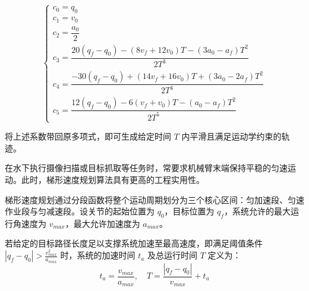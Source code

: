 \begin{equation}
    \begin{cases}
    c_0 = q_0 \\
    c_1 = v_0 \\
    c_2 = \dfrac{a_0}{2}\\
    c_3 = \dfrac{20(q_f - q_0) - (8v_f + 12v_0)T - (3a_0 - a_f)T^2}{2T^3} \\[8pt]
    c_4 = \dfrac{-30(q_f - q_0) + (14v_f + 16v_0)T + (3a_0 - 2a_f)T^2}{2T^4} \\[8pt]
    c_5 = \dfrac{12(q_f - q_0) - 6(v_f + v_0)T - (a_0 - a_f)T^2}{2T^5}
    \end{cases}
    \end{equation}

将上述系数带回原多项式，即可生成给定时间 $T$ 内平滑且满足运动学约束的轨迹。


在水下执行摄像扫描或目标抓取等任务时，常要求机械臂末端保持平稳的匀速运动。此时，梯形速度规划算法具有更高的工程实用性。

梯形速度规划通过分段函数将整个运动周期划分为三个核心区间：匀加速段、匀速作业段与匀减速段。设关节的起始位置为 $q_0$，目标位置为 $q_f$，系统允许的最大运行角速度为 $v_{max}$，最大允许加速度为 $a_{max}$。

若给定的目标路径长度足以支撑系统加速至最高速度，即满足阈值条件 $|q_f - q_0| > \frac{v_{max}^2}{a_{max}}$ 时，系统的加速时间 $t_a$ 及总运行时间 $T$ 定义为：
\begin{equation}
    t_a = \frac{v_{max}}{a_{max}}, \quad T = \frac{|q_f - q_0|}{v_{max}} + t_a
\end{equation}

